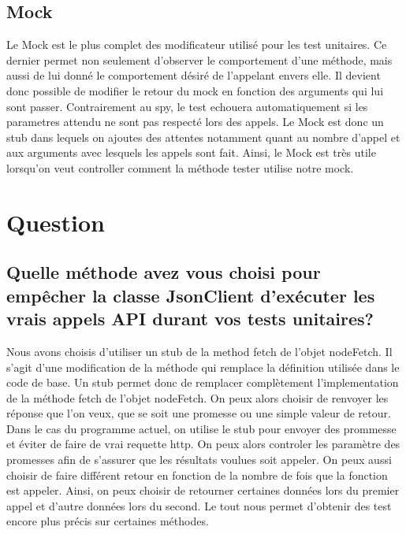 \documentclass{article}
\begin{document}
\subsection*{Mock}
Le Mock est le plus complet des modificateur utilisé pour les test unitaires.
Ce dernier permet non seulement d'observer le comportement d'une méthode, mais aussi de lui donné le comportement désiré de l'appelant envers elle.
Il devient donc possible de modifier le retour du mock en fonction des arguments qui lui sont passer.
Contrairement au spy, le test echouera automatiquement si les parametres attendu ne sont pas respecté lors des appels.
Le Mock est donc un stub dans lequels on ajoutes des attentes notamment quant au nombre d'appel et aux arguments avec lesquels les appels sont fait.
Ainsi, le Mock est très utile lorsqu'on veut controller comment la méthode tester utilise notre mock.
\section*{Question}
\subsection*{Quelle méthode avez vous choisi pour empêcher la classe JsonClient d’exécuter
  les vrais appels API durant vos tests unitaires?}
Nous avons choisis d'utiliser un stub de la method fetch de l'objet nodeFetch.
Il s'agit d'une modification de la méthode qui remplace la définition utilisée dans le code de base.
Un stub permet donc de remplacer complètement l'implementation de la méthode fetch de l'objet nodeFetch.
On peux alors choisir de renvoyer les réponse que l'on veux, que se soit une promesse ou une simple valeur de retour.
Dans le cas du programme actuel, on utilise le stub pour envoyer des prommesse et éviter de faire de vrai requette http.
On peux alors controler les paramètre des promesses afin de s'assurer que les résultats voulues soit appeler.
On peux aussi choisir de faire différent retour en fonction de la nombre de fois que la fonction est appeler.
Ainsi, on peux choisir de retourner certaines données lors du premier appel et d'autre données lors du second.
Le tout nous permet d'obtenir des test encore plus précis sur certaines méthodes.
\end{document}
